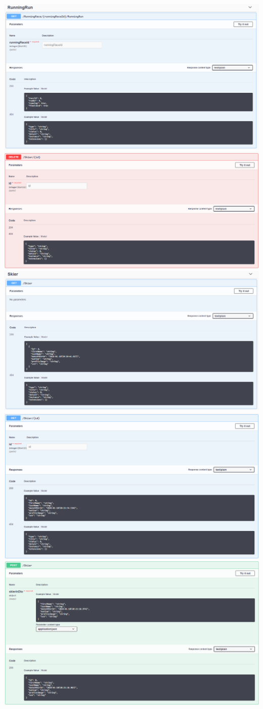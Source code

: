 \documentclass[a4paper, 12pt]{article}
\begin{document}
	\newline
	\includegraphics[width=.7\textwidth]{img/Controller_runningRun_get.png}
	\newline	
	\includegraphics[width=.7\textwidth]{img/Controller_skier_delete.png}
	\newline	
	\includegraphics[width=.7\textwidth]{img/Controller_skier_get_all.png}
	\newline	
	\includegraphics[width=.7\textwidth]{img/Controller_skier_get_byId.png}
	\newline	
	\includegraphics[width=.7\textwidth]{img/Controller_skier_post.png}
\end{document}
